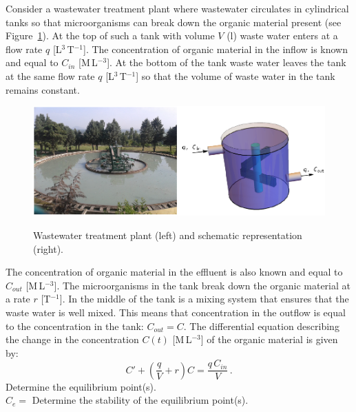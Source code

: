 \begin{Exercise} Consider a wastewater treatment plant where wastewater circulates in cylindrical tanks so that microorganisms can break down the organic material present (see Figure~\ref{fig:afvalwater}). At the top of such a tank with volume $V$ (l) waste water enters at a flow rate $q$ [L$^3\,$T$^{-1}$]. The concentration of organic material in the inflow is known and equal to $C_{in}$ [M$\,$L$^{-3}$]. At the bottom of the tank waste water leaves the tank at the same flow rate $q$ [L$^3\,$T$^{-1}$] so that the volume of waste water in the tank remains constant.
	
\begin{figure}[H]
\centering
\includegraphics[width=15cm]{afvalwater.png}\\
\caption{Wastewater treatment plant (left) and schematic representation (right).\label{fig:afvalwater}}
\end{figure}	

The concentration of organic material in the effluent is also known and equal to $C_{out}$ [M$\,$L$^{-3}$]. The microorganisms in the tank break down the organic material at a rate $r$ [T$^{-1}$]. In the middle of the tank is a mixing system that ensures that the waste water is well mixed. This means that concentration in the outflow is equal to the concentration in the tank: $C_{out} = C$.
The differential equation describing the change in the concentration $C(t)$ [M$\,$L$^{-3}$] of the organic material is given by:
$$
C' + \left(\dfrac{q}{V} + r\right)C = \dfrac{q\,C_{in}}{V}\,.
$$
		\Question Determine the equilibrium point(s). \\[0.5cm]
		$C_e = $\vspace*{1cm}
		\Question Determine the stability of the equilibrium point(s).
    \EndCurrentQuestion
\end{Exercise}


